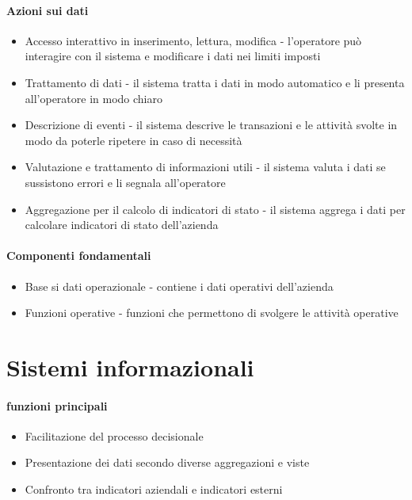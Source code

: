     \paragraph{Azioni sui dati}
        \begin{itemize}
            \item Accesso interattivo in inserimento, lettura, modifica - l'operatore può interagire con il sistema e modificare i dati nei limiti imposti 
            \item Trattamento di dati - il sistema tratta i dati in modo automatico e li presenta all'operatore in modo chiaro 
            \item Descrizione di eventi - il sistema descrive le transazioni e le attività svolte in modo da poterle ripetere in caso di necessità
            \item Valutazione e trattamento di informazioni utili - il sistema valuta i dati se sussistono errori e li segnala all'operatore
            \item Aggregazione per il calcolo di indicatori di stato - il sistema aggrega i dati per calcolare indicatori di stato dell'azienda
        \end{itemize}
    \paragraph{Componenti fondamentali}
        \begin{itemize}
            \item Base si dati operazionale - contiene i dati operativi dell'azienda
            \item Funzioni operative - funzioni che permettono di svolgere le attività operative
        \end{itemize}
\section{Sistemi informazionali}
    \paragraph{funzioni principali}
        \begin{itemize}
            \item Facilitazione del processo decisionale
            \item Presentazione dei dati secondo diverse aggregazioni e viste
            \item Confronto tra indicatori aziendali e indicatori esterni
        \end{itemize}
